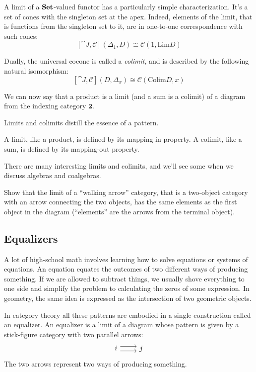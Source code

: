 \documentclass[DaoFP]{subfiles}
\begin{document}
A limit of a $\mathbf{Set}$-valued functor has a particularly simple characterization. It's a set of cones with the singleton set at the apex. Indeed, elements of the limit, that is functions from the singleton set to it, are in one-to-one correspondence with such cones:
\[ [\cat J, \mathcal{C}](\Delta_1, D)  \cong \mathcal{C}(1, \text{Lim}D) \]


Dually, the universal cocone is called a \emph{colimit}, and is described by the following natural isomorphism:
\[ [\cat J, \mathcal{C}](D, \Delta_x)  \cong \mathcal{C}( \text{Colim}D, x) \]


We can now say that a product is a limit (and a sum is a colimit) of a diagram from the indexing category $\mathbf{2}$.

Limits and colimits distill the essence of a pattern. 

A limit, like a product, is defined by its mapping-in property. A colimit, like a sum, is defined by its mapping-out property.

There are many interesting limits and colimits, and we'll see some when we discuss algebras and coalgebras.

\begin{exercise}
Show that the limit of a ``walking arrow'' category, that is a two-object category with an arrow connecting the two objects, has the same elements as the first object in the diagram (``elements'' are the arrows from the terminal object).
\end{exercise}

\subsection{Equalizers}

A lot of high-school math involves learning how to solve equations or systems of equations. An equation equates the outcomes of two different ways of producing something. If we are allowed to subtract things, we usually shove everything to one side and simplify the problem to calculating the zeros of some expression. In geometry, the same idea is expressed as the intersection of two geometric objects.

In category theory all these patterns are embodied in a single construction called an equalizer. An equalizer is a limit of a diagram whose pattern is given by a stick-figure category with two parallel arrows:
\[
\begin{tikzcd}
i \arrow[r, shift left=0.75ex]
  \arrow[r, shift right=0.75ex]
&
j
\end{tikzcd}
\]
The two arrows represent two ways of producing something. 
\end{document}
